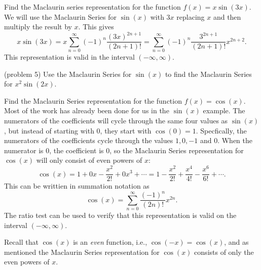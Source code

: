 \documentclass{ximera}
\begin{document}
\begin{example}[example 5]
Find the Maclaurin series representation for the function $f(x) = x\sin(3x)$.\\
We will use the Maclaurin Series for $\sin(x)$ with $3x$ replacing $x$ and then multiply the result by $x$.
This gives
\[
x\sin(3x) = x \sum_{n=0}^\infty (-1)^n\frac{(3x)^{2n+1}}{(2n+1)!} = \sum_{n=0}^\infty (-1)^n \frac{3^{2n+1}}{(2n+1)!}x^{2n+2}.
\]
This representation is valid in the interval $(-\infty, \infty)$.
\end{example}


\begin{problem}(problem 5)
Use the Maclaurin Series for $\sin(x)$ to find the Maclaurin Series for $x^2 \sin(2x)$.
\begin{multipleChoice}
\end{multipleChoice}
\end{problem}

\begin{example} 
Find the Maclaurin Series representation for the function $f(x) = \cos(x)$.\\
Most of the work has already been done for us in the $\sin(x)$ example.  The numerators of the coefficients will cycle through the same
four values as $\sin(x)$, but instead of starting with 0, they start with $\cos(0) = 1$. 
Specfically, the numerators of the coefficients cycle through the values $1, 0, -1$ and $0$.  When the numerator is 0, the coefficient is 0,
so the Maclaurin Series representation for $\cos(x)$ will only consist of even powers of $x$:
\[
\cos(x) = 1 + 0x - \frac{x^2}{2!} + 0x^3 + \cdots = 1 - \frac{x^2}{2!} + \frac{x^4}{4!} - \frac{x^6}{6!} + \cdots.
\]
This can be writtien in summation notation as
\[
\cos(x) = \sum_{n=0}^\infty \frac{(-1)^n}{(2n)!}x^{2n}.
\]
The ratio test can be used to verify that this representation is valid on the interval $(-\infty, \infty)$.
\begin{remark}
Recall that $\cos(x)$ is an \textit{even} function, 
i.e., $\cos(-x) = \cos(x)$, and as mentioned the Maclaurin Series representation for $\cos(x)$ consists of only the 
even powers of $x$.
\end{remark} 
\end{example}
\end{document}
